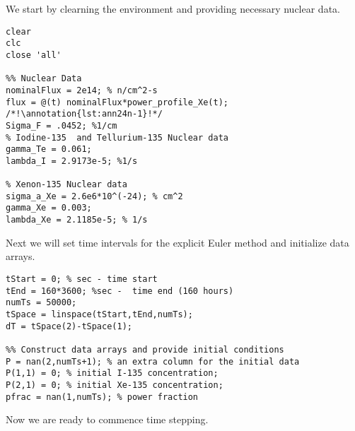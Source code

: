 \noindent We start by clearning the environment and providing necessary nuclear data. 
\begin{lstlisting}[style=myMatlab,name=lec24n-ex1]
clear
clc
close 'all'

%% Nuclear Data
nominalFlux = 2e14; % n/cm^2-s  
flux = @(t) nominalFlux*power_profile_Xe(t); /*!\annotation{lst:ann24n-1}!*/
Sigma_F = .0452; %1/cm 
% Iodine-135  and Tellurium-135 Nuclear data
gamma_Te = 0.061; 
lambda_I = 2.9173e-5; %1/s

% Xenon-135 Nuclear data
sigma_a_Xe = 2.6e6*10^(-24); % cm^2
gamma_Xe = 0.003; 
lambda_Xe = 2.1185e-5; % 1/s 
\end{lstlisting}
\noindent Next we will set time intervals for the explicit Euler method and initialize data arrays.
\begin{lstlisting}[style=myMatlab,name=lec24n-ex1]
%% Time discretization
tStart = 0; % sec - time start
tEnd = 160*3600; %sec -  time end (160 hours)
numTs = 50000; 
tSpace = linspace(tStart,tEnd,numTs);
dT = tSpace(2)-tSpace(1);

%% Construct data arrays and provide initial conditions
P = nan(2,numTs+1); % an extra column for the initial data
P(1,1) = 0; % initial I-135 concentration;
P(2,1) = 0; % initial Xe-135 concentration;
pfrac = nan(1,numTs); % power fraction

\end{lstlisting}
\noindent Now we are ready to commence time stepping.
